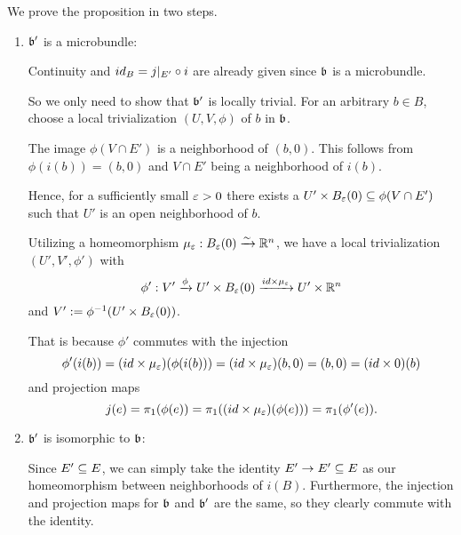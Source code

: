 \begin{myproof}
    We prove the proposition in two steps.
    \begin{enumerate}
        \item $\mathfrak{b}'$ is a microbundle:
        
        Continuity and $id_B = j\vert_{E'} \circ i$ are already given since $\mathfrak{b}$ is a microbundle.

        So we only need to show that $\mathfrak{b}'$ is locally trivial.
        For an arbitrary $b \in B$, choose a local trivialization $(U, V, \phi)$ of $b$ in $\mathfrak{b}$.
        
        The image $\phi(V \cap E')$ is a neighborhood of $(b, 0)$.
        This follows from $\phi(i(b)) = (b, 0)$ and $V \cap E'$ being a neighborhood of $i(b)$.

        Hence, for a sufficiently small $\varepsilon{} > 0$ there
        exists a $U' \times \ball[\eps] \sub \phi(V \cap E')$ such that
        $U'$ is an open neighborhood of $b$.

        Utilizing a homeomorphism $\mu_\eps: \ball[\eps] \isomto \R^n$,
        we have a local trivialization $(U', V', \phi')$ with
        \[ \phi': V' \xto{\phi} U' \times \ball[\eps] \xto{id \times \mu_\eps} U' \times \R^n \]
        and $V' := \inv{\phi}(U' \times \ball[\eps])$.

        That is because $\phi'$ commutes with the injection
        \[ \phi'(i(b)) =  (id \times \mu_\varepsilon{})(\phi(i(b))) = (id \times \mu_\varepsilon{})(b, 0) = (b, 0) = (id \times 0)(b)\]
        and projection maps
        \[ j(e) = \pi_1(\phi(e)) = \pi_1((id \times \mu_\varepsilon{})(\phi(e))) = \pi_1(\phi'(e)). \]
        
        \item $\mathfrak{b}'$ is isomorphic to $\mathfrak{b}$:

        Since $E' \subseteq{} E$, we can simply take the identity $E' \to E' \subseteq{} E$
        as our homeomorphism between neighborhoods of $i(B)$.
        Furthermore, the injection and projection maps for $\mathfrak{b}$ and $\mathfrak{b}'$ are the same,
        so they clearly commute with the identity.
    \end{enumerate}
\end{myproof}
